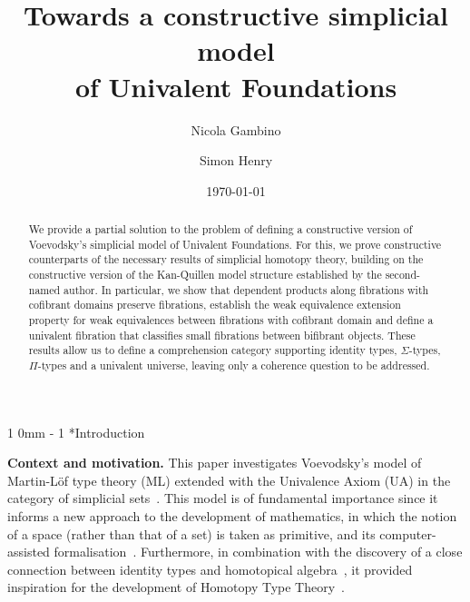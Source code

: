 \documentclass[reqno,10pt,a4paper,oneside,draft]{amsart}
\title[]{Towards a constructive  simplicial model \\ of Univalent Foundations}
\makeatletter
\renewcommand{\section}{\@startsection
{section}%
{1}%
{0mm}%
{-\baselineskip}%
{1\baselineskip}%
{\Large \bfseries}}%
\numberwithin{equation}{section}
\theoremstyle{mythm}
\theoremstyle{mydef}
\theoremstyle{myrmk}
\makeatother
\begin{document}
\begin{abstract}
We provide a partial solution to the problem of defining a constructive version of 
Voevodsky's simplicial model of Univalent Foundations. For this, we prove constructive counterparts of the 
necessary results of simplicial homotopy theory, building on the constructive
version of the Kan-Quillen model structure established by the second-named author. In particular, 
 we show  that dependent products along fibrations with
 cofibrant domains preserve fibrations, establish the weak equivalence extension property
for weak equivalences between fibrations with cofibrant domain and define a univalent 
fibration that classifies small fibrations between bifibrant objects. 
These results allow us to define a comprehension category supporting identity types,
$\Sigma$-types, $\Pi$-types and a univalent universe, leaving only
a coherence question to be addressed.
\end{abstract}

\author{Nicola Gambino}
\address{School of Mathematics, University of Leeds, United Kingdom}


\author{Simon Henry}
\address{Department of Mathematics and Statistics, University of Ottawa, Canads}


 \date{\today}
 
 

\maketitle

\tableofcontents

\section*{Introduction} 

\textbf{Context and motivation.} This paper investigates Voevodsky's model of Martin-L\"of type theory (ML)
extended with the Univalence Axiom (UA)  in the category of simplicial sets~\cite{voevodsky-simplicial-model,StreicherT:modtts}.  This model is of fundamental importance since it  informs a new approach to the development of mathematics, in which the notion of a space (rather than that of a set) is taken as primitive, 
  and its computer-assisted formalisation~\cite{voevodsky:library}. Furthermore, in combination with the discovery of a close connection between identity types and homotopical algebra~\cite{awodey-warren:homotopy-idtype,gambino-garner:idtypewfs}, it provided inspiration for the development of  Homotopy Type Theory~\cite{hottbook}.
\end{document}
